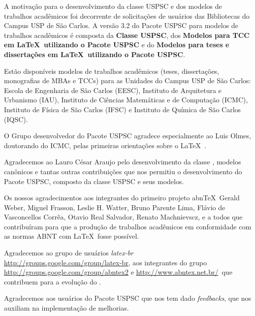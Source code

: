 \begin{agradecimentos}
	A motivação para o desenvolvimento da classe USPSC e dos modelos de trabalhos acadêmicos foi decorrente de solicitações de usuários das Bibliotecas do Campus USP de São Carlos. A versão 3.2 do Pacote USPSC para modelos de trabalhos acadêmicos é composta da \textbf{Classe USPSC}, dos \textbf{Modelos para TCC em \LaTeX\ utilizando o Pacote USPSC} e do \textbf{Modelos para teses e dissertações em \LaTeX\ utilizando o Pacote USPSC}.
	
	Estão disponíveis modelos de trabalhos acadêmicos (teses, dissertações, monografias de MBAs e TCCs) para as Unidades do Campus USP de São Carlos: Escola de Engenharia de São Carlos (EESC), Instituto de Arquitetura e Urbanismo (IAU), Instituto de Ciências Matemáticas e de Computação (ICMC), Instituto de Física de São Carlos (IFSC) e Instituto de Química de São Carlos (IQSC).
	
	O Grupo desenvolvedor do Pacote USPSC agradece especialmente ao Luis Olmes, doutorando do ICMC, pelas primeiras orientações sobre o \LaTeX\ . 
	
	Agradecemos ao Lauro César Araujo pelo desenvolvimento da classe  \abnTeX, modelos canônicos e tantas outras contribuições que nos permitiu o desenvolvimento do Pacote USPSC, composto da classe USPSC e seus modelos.
	
	Os nossos agradecimentos aos integrantes do primeiro
	projeto abn\TeX\, Gerald Weber, Miguel Frasson, Leslie H. Watter, Bruno Parente Lima, Flávio de Vasconcellos Corrêa, Otavio Real
	Salvador, Renato Machnievscz, e a todos que contribuíram para que a produção de trabalhos acadêmicos em conformidade com
	as normas ABNT com \LaTeX\ fosse possível.
	
	Agradecemos ao grupo de usuários
	\emph{latex-br}  {\url{http://groups.google.com/group/latex-br}}, aos integrantes do grupo
	\emph{\abnTeX}  {\url{http://groups.google.com/group/abntex2}  e \url{http://www.abntex.net.br/}}~que contribuem para a evolução do \abnTeX.
	
	Agradecemos aos usuários do Pacote USPSC que nos tem dado \textit{feedbacks}, que nos auxiliam na implementação de melhorias. 
	
\end{agradecimentos}
